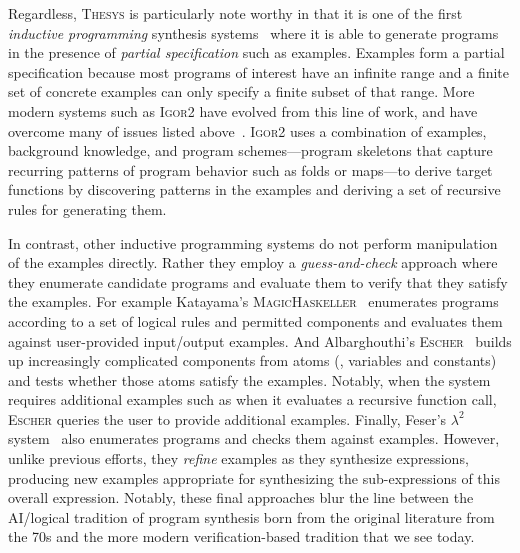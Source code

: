 Regardless, \textsc{Thesys} is particularly note worthy in that it is one of the first \emph{inductive programming} synthesis systems~\citep{kitzelmann-aaip-2010} where it is able to generate programs in the presence of \emph{partial specification} such as examples.
Examples form a partial specification because most programs of interest have an infinite range and a finite set of concrete examples can only specify a finite subset of that range.
More modern systems such as \textsc{Igor2} have evolved from this line of work, and have overcome many of issues listed above~\citep{kitzelmann-thesis-2010, hofmann-aaip-2010}.
\textsc{Igor2} uses a combination of examples, background knowledge, and program schemes---program skeletons that capture recurring patterns of program behavior such as folds or maps---to derive target functions by discovering patterns in the examples and deriving a set of recursive rules for generating them.

In contrast, other inductive programming systems do not perform manipulation of the examples directly.
Rather they employ a \emph{guess-and-check} approach where they enumerate candidate programs and evaluate them to verify that they satisfy the examples.
For example Katayama's \textsc{MagicHaskeller}~\citep{katayama-pepm-2012} enumerates programs according to a set of
logical rules and permitted components and evaluates them against user-provided input/output examples.
And Albarghouthi's \textsc{Escher}~\citep{albarghouthi-cav-2013} builds up increasingly complicated components from atoms (\ie, variables and constants) and tests whether those atoms satisfy the examples.
Notably, when the system requires additional examples such as when it evaluates a recursive function call, \textsc{Escher} queries the user to provide additional examples.
Finally, Feser's $λ^2$ system~\citep{feser-pldi-2015} also enumerates programs and checks them against examples.
However, unlike previous efforts, they \emph{refine} examples as they synthesize expressions, producing new examples appropriate for synthesizing the sub-expressions of this overall expression.
Notably, these final approaches blur the line between the AI/logical tradition of program synthesis born from the original literature from the 70s and the more modern verification-based tradition that we see today.

